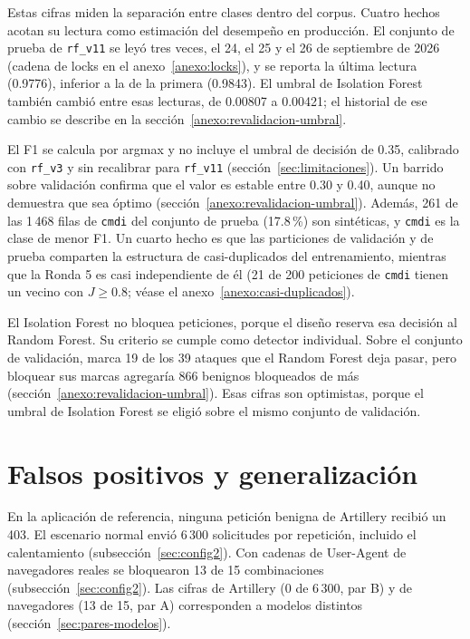 Estas cifras miden la separación entre clases dentro del corpus. Cuatro hechos acotan su lectura como estimación del desempeño en producción. El conjunto de prueba de \texttt{rf\_v11} se leyó tres veces, el 24, el 25 y el 26 de septiembre de 2026 (cadena de locks en el anexo~\ref{anexo:locks}), y se reporta la última lectura (0.9776), inferior a la de la primera (0.9843). El umbral de Isolation Forest también cambió entre esas lecturas, de 0.00807 a 0.00421; el historial de ese cambio se describe en la sección~\ref{anexo:revalidacion-umbral}.

El F1 se calcula por argmax y no incluye el umbral de decisión de 0.35, calibrado con \texttt{rf\_v3} y sin recalibrar para \texttt{rf\_v11} (sección~\ref{sec:limitaciones}). Un barrido sobre validación confirma que el valor es estable entre 0.30 y 0.40, aunque no demuestra que sea óptimo (sección~\ref{anexo:revalidacion-umbral}). Además, 261 de las 1\,468 filas de \texttt{cmdi} del conjunto de prueba (17.8\,\%) son sintéticas, y \texttt{cmdi} es la clase de menor F1. Un cuarto hecho es que las particiones de validación y de prueba comparten la estructura de casi-duplicados del entrenamiento, mientras que la Ronda 5 es casi independiente de él (21 de 200 peticiones de \texttt{cmdi} tienen un vecino con $J \geq 0.8$; véase el anexo~\ref{anexo:casi-duplicados}).

El Isolation Forest no bloquea peticiones, porque el diseño reserva esa decisión al Random Forest. Su criterio se cumple como detector individual. Sobre el conjunto de validación, marca 19 de los 39 ataques que el Random Forest deja pasar, pero bloquear sus marcas agregaría 866 benignos bloqueados de más (sección~\ref{anexo:revalidacion-umbral}). Esas cifras son optimistas, porque el umbral de Isolation Forest se eligió sobre el mismo conjunto de validación.

\section{Falsos positivos y generalización}

En la aplicación de referencia, ninguna petición benigna de Artillery recibió un 403. El escenario normal envió 6\,300 solicitudes por repetición, incluido el calentamiento (subsección~\ref{sec:config2}). Con cadenas de User-Agent de navegadores reales se bloquearon 13 de 15 combinaciones (subsección~\ref{sec:config2}). Las cifras de Artillery (0 de 6\,300, par B) y de navegadores (13 de 15, par A) corresponden a modelos distintos (sección~\ref{sec:pares-modelos}).

